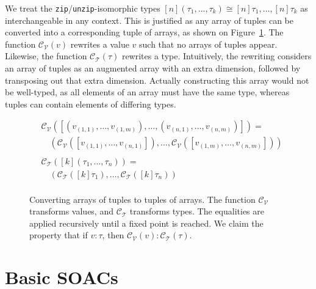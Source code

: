\newcommand{\convV}{\mathcal{C}_{\mathcal{V}}}
\newcommand{\convT}{\mathcal{C}_{\mathcal{T}}}

We treat the \texttt{zip}/\texttt{unzip}-isomorphic types
$[n](\tau_1, \ldots, \tau_k) \cong [n]\tau_1 , \ldots , [n]\tau_k$ as
interchangeable in any context.  This is justified as any array of
tuples can be converted into a corresponding tuple of arrays, as shown
on Figure~\ref{fig:calc-tuple-transform}.  The function $\convV(v)$
rewrites a value $v$ such that no arrays of tuples appear.  Likewise,
the function $\convT(\tau)$ rewrites a type.  Intuitively, the
rewriting considers an array of tuples as an augmented array with an
extra dimension, followed by transposing out that extra dimension.
Actually constructing this array would not be well-typed, as all
elements of an array must have the same type, whereas tuples can
contain elements of differing types.

\begin{figure}
  \centering
  \begin{align*}
    &\convV([(v_{(1,1)}, \ldots, v_{(1,m)}),\ldots,(v_{(n,1)}, \ldots, v_{(n,m)})]) =\\
    &\quad (\convV([v_{(1,1)},\ldots,v_{(n,1)}]),\ldots,\convV([v_{(1,m)},\ldots,v_{(n,m)}]))\\
    \\
    &\convT([k](\tau_{1},\ldots,\tau_{n})) =\\
    &\quad(\convT([k]\tau_{1}),\ldots,\convT([k]\tau_{n})) \\
  \end{align*}
  \caption{Converting arrays of tuples to tuples of arrays.  The
    function $\convV$ transforms values, and $\convT$ transforms
    types.  The equalities are applied recursively until a fixed point
    is reached.  We claim the property that if $v : \tau$, then
    $\convV(v) : \convT(\tau)$.}
  \label{fig:calc-tuple-transform}
\end{figure}

\section{Basic SOACs}

